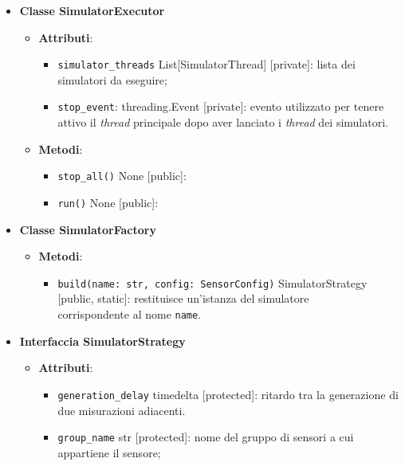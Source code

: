 \begin{itemize}
	\item \textbf{Classe SimulatorExecutor}
	      \begin{itemize}
		      \item \textbf{Attributi}:
		            \begin{itemize}
			            \item \texttt{simulator\_threads} List[SimulatorThread] [private]: lista dei simulatori da eseguire;
			            \item \texttt{stop\_event}: threading.Event [private]: evento utilizzato per tenere attivo il \textit{thread} principale dopo aver lanciato i \textit{thread} dei simulatori.
		            \end{itemize}
		      \item \textbf{Metodi}:
		            \begin{itemize}
			            \item \texttt{stop\_all()} None [public]:
			            \item \texttt{run()} None [public]:
		            \end{itemize}
	      \end{itemize}
	\item \textbf{Classe SimulatorFactory}
	      \begin{itemize}
		      \item \textbf{Metodi}:
		            \begin{itemize}
			            \item \texttt{build(name: str, config: SensorConfig)} SimulatorStrategy [public, static]: restituisce un'istanza del simulatore \\ corrispondente al nome \texttt{name}.
		            \end{itemize}
	      \end{itemize}
	\item \textbf{Interfaccia SimulatorStrategy}
	      \begin{itemize}
		      \item \textbf{Attributi}:
		            \begin{itemize}
			            \item \texttt{generation\_delay} timedelta [protected]: ritardo tra la generazione di due misurazioni adiacenti.
			            \item \texttt{group\_name} str [protected]: nome del gruppo di sensori a cui appartiene il sensore;

\end{itemize}
\end{itemize}
\end{itemize}
